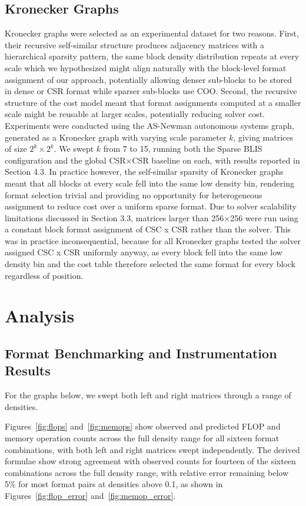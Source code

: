 \documentclass[sigconf, review, anonymous]{acmart}
\begin{document}
\subsection{Kronecker Graphs}
Kronecker graphs were selected as an experimental dataset for two reasons.
First, their recursive self-similar structure produces adjacency matrices with a
hierarchical sparsity pattern, the same block density distribution repeats at every scale
which we hypothesized might align naturally with the block-level format assignment
of our approach, potentially allowing denser sub-blocks to be stored in dense or
CSR format while sparser sub-blocks use COO. Second, the recursive structure of
the cost model meant that format assignments computed at a smaller scale might
be reusable at larger scales, potentially reducing solver cost.
Experiments were conducted using the AS-Newman autonomous systems graph,
generated as a Kronecker graph with varying scale parameter $k$, giving
matrices of size $2^k \times 2^k$. We swept $k$ from 7 to 15, running both the
Sparse BLIS configuration and the global CSR×CSR baseline on each, with results
reported in Section 4.3.
In practice however, the self-similar sparsity of Kronecker graphs meant
that all blocks at every scale fell into the same low density bin, rendering
format selection trivial and providing no opportunity for heterogeneous assignment
to reduce cost over a uniform sparse format.
Due to solver scalability limitations discussed in Section 3.3, matrices larger than
256×256 were run using a constant block format assignment of CSC x CSR rather than the
solver. This was in practice inconsequential, because for all Kronecker graphs tested the
solver assigned CSC x CSR uniformly anyway, as every block fell into the same low density
bin and the cost table therefore selected the same format for every block regardless of position.

\section{Analysis}

\subsection{Format Benchmarking and Instrumentation Results}
For the graphs below, we swept both left and right matrices through a range of densities.

Figures~\ref{fig:flops} and~\ref{fig:memops} show observed and predicted FLOP and
memory operation counts across the full density range for all sixteen
format combinations, with both left and right matrices swept independently.
The derived formulae show strong agreement with observed counts for fourteen of
the sixteen combinations across the full density range, with relative error remaining
below 5\% for most format pairs at densities above 0.1, as shown in
Figures~\ref{fig:flop_error} and~\ref{fig:memop_error}.
\end{document}
